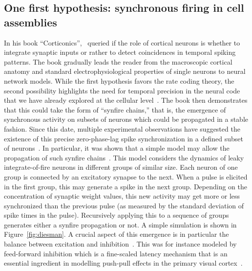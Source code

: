 \documentclass[brainsci, %
               review,submit,pdftex,moreauthors%
               ]{Definitions/mdpi}
\begin{document}
\subsection{One first hypothesis: synchronous firing in cell assemblies}
%
In his book ``Corticonics'',~\citet{abeles_corticonics_1991} queried if the role of cortical neurons is whether to integrate synaptic inputs or rather to detect coincidences in temporal spiking patterns. The book gradually leads the reader from the macroscopic cortical anatomy and standard electrophysiological properties of single neurons to neural network models. While the first hypothesis favors the rate coding theory, the second possibility highlights the need for temporal precision in the neural code that we have already explored at the cellular level~\citep{paugam-moisy_computing_2012}. The book then demonstrates that this could take the form of ``synfire chains,'' that is, the emergence of synchronous activity on subsets of neurons which could be propagated in a stable fashion. Since this date, multiple experimental observations have suggested the existence of this precise zero-phase-lag spike synchronization in a defined subset of neurons~\citep{harris_organization_2003}.
%
In particular, it was shown that a simple model may allow the propagation of such synfire chains~\citep{gewaltig_propagation_2001}. This model considers the dynamics of leaky integrate-of-fire neurons in different groups of similar size. Each neuron of one group is connected by an excitatory synapse to the next. When a pulse is elicited in the first group, this may generate a spike in the next group. Depending on the concentration of synaptic weight values, this new activity may get more or less synchronized than the previous pulse (as measured by the standard deviation of spike times in the pulse). Recursively applying this to a sequence of groups generates either a synfire propagation or not. A simple simulation is shown in Figure~\ref{fig:diesman}. A crucial aspect of this emergence is in particular the balance between excitation and inhibition~\citep{azouz_stimulus-selective_2008}. This was for instance modeled by feed-forward inhibition which is a fine-scaled latency mechanism that is an essential ingredient in modelling push-pull effects in the primary visual cortex~\citep{kremkow_push-pull_2016}.
\end{document}

